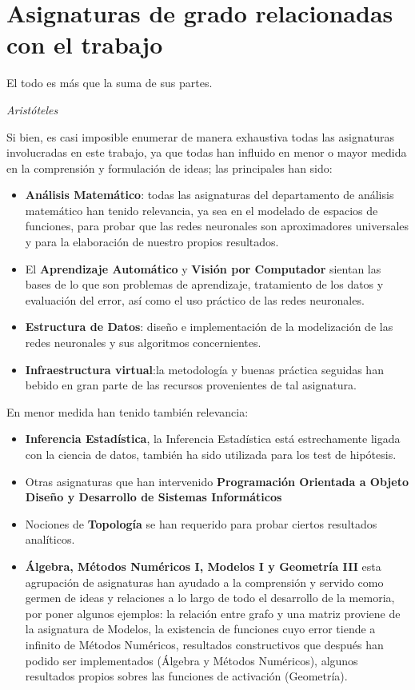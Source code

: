 
\section{Asignaturas de grado relacionadas con el trabajo }  

\epigraph{El todo es más que la suma de sus partes.
}{\textit{Aristóteles}}
Si bien, es casi imposible enumerar de manera
exhaustiva todas las asignaturas involucradas en este trabajo,
ya que todas han influido en menor o mayor medida en la comprensión 
y formulación de ideas; las principales han
sido: 
\begin{itemize}
    \item \textbf{Análisis Matemático}: todas las asignaturas del departamento de análisis matemático
    han tenido relevancia, ya sea en el modelado de espacios de funciones,
    para probar que las redes neuronales son aproximadores universales
    y para la elaboración de nuestro propios resultados.  
    \item El \textbf{Aprendizaje Automático} y \textbf{Visión por Computador} sientan las bases de lo que son problemas de aprendizaje, 
    tratamiento de los datos y evaluación del error, así como el uso práctico de las redes neuronales. 
    \item \textbf{Estructura de Datos}: diseño e implementación de la modelización de las redes neuronales y 
    sus algoritmos concernientes. 
    \item \textbf{Infraestructura virtual}:la metodología y buenas práctica seguidas han 
    bebido en gran parte de las recursos provenientes de tal asignatura. 
\end{itemize}

En menor medida han tenido también relevancia: 
\begin{itemize}
    \item \textbf{Inferencia Estadística}, la Inferencia Estadística está estrechamente ligada con 
    la ciencia de datos, también ha sido utilizada para los test de hipótesis. 
    \item Otras asignaturas que han intervenido \textbf{Programación Orientada a Objeto} \textbf{Diseño y Desarrollo de Sistemas Informáticos}
    \item Nociones de \textbf{Topología} se han requerido para probar ciertos resultados analíticos. 
    \item \textbf{Álgebra, Métodos Numéricos I, Modelos I y Geometría III} esta agrupación de asignaturas 
    han ayudado a la comprensión  y servido como germen de ideas y relaciones a lo largo de todo el desarrollo de la memoria, 
    por poner algunos ejemplos: la relación entre grafo y una matriz proviene de la asignatura de Modelos, 
    la existencia de funciones cuyo error tiende a infinito de Métodos Numéricos,
    resultados constructivos  que después han podido ser implementados (Álgebra y Métodos Numéricos), algunos resultados propios sobres las funciones de activación (Geometría).
\end{itemize}